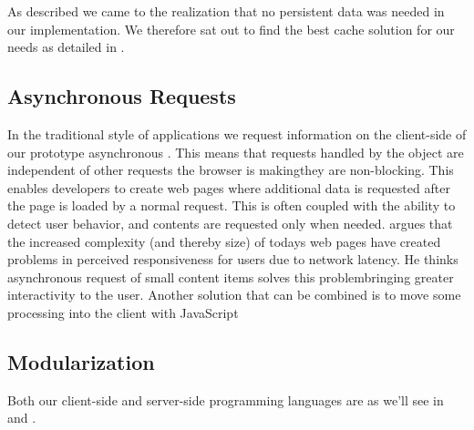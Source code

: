 As described we came to the realization that no persistent data was needed
in our implementation.
We therefore sat out to find the best cache solution for our needs as detailed
in .


\subsection{Asynchronous Requests}

In the traditional style of  applications we request information on
the client-side of our prototype asynchronous%
.
This means that requests handled by the  object
are independent of other requests the browser is making\dash{}they
are non-blocking. This enables developers to create web pages where additional
data is requested after the page is loaded by a normal  request.
This is often coupled with the ability to detect user behavior, and contents
are requested only when needed. \citet[pp.281--282]{stamey06} argues that
the increased complexity (and thereby size) of todays web pages have created
problems in perceived responsiveness for users due to network latency. He
thinks asynchronous request of small content items solves this
problem\dash{}bringing greater interactivity to the user. Another solution
that can be combined is to move some processing into the client with
JavaScript \citep[]{jazayeri07}

\subsection{Modularization}

Both our client-side and server-side programming languages are as we'll see in
 and
.

